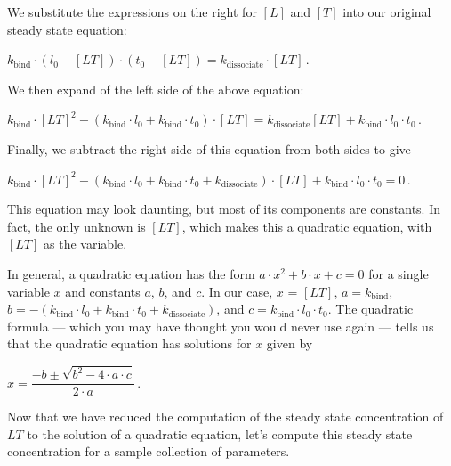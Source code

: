 We substitute the expressions on the right for $[L]$ and $[T]$ into our original steady state equation:

\begin{center}
$k_\text{bind} \cdot (l_0 - [LT]) \cdot (t_0 - [LT]) = k_\text{dissociate} \cdot [LT]$\,.
\end{center}

\noindent We then expand of the left side of the above equation:

\begin{center}
$k_\text{bind} \cdot [LT]^2 - (k_\text{bind} \cdot l_0 + k_\text{bind} \cdot t_0) \cdot [LT]  = k_\text{dissociate} [LT] + k_\text{bind} \cdot l_0 \cdot t_0$\,.
\end{center}

\noindent Finally, we subtract the right side of this equation from both sides to give

\begin{center}
$k_\text{bind} \cdot [LT]^2 - (k_\text{bind} \cdot l_0 + k_\text{bind} \cdot t_0 + k_\text{dissociate}) \cdot [LT] + k_\text{bind} \cdot l_0 \cdot t_0 = 0$\,.
\end{center}

\noindent This equation may look daunting, but most of its components are constants. In fact, the only unknown is $[LT]$, which makes this a quadratic equation, with $[LT]$ as the variable.

In general, a quadratic equation has the form $a \cdot x^2 + b \cdot x + c = 0$ for a single variable $x$ and constants $a$, $b$, and $c$. In our case, $x$ = $[LT]$, $a = k_\text{bind}$, $b = - (k_\text{bind} \cdot l_0 + k_\text{bind} \cdot t_0 + k_\text{dissociate})$, and $c = k_\text{bind} \cdot l_0 \cdot t_0$. The quadratic formula --- which you may have thought you would never use again --- tells us that the quadratic equation has solutions for $x$ given by

\begin{center}
$x = \dfrac{-b \pm \sqrt{b^2 - 4 \cdot a \cdot c}}{2 \cdot a}$\,.
\end{center}

\fudgespace

\begin{qbox}\end{qbox}

Now that we have reduced the computation of the steady state concentration of $LT$ to the solution of a quadratic equation, let's compute this steady state concentration for a sample collection of parameters.

